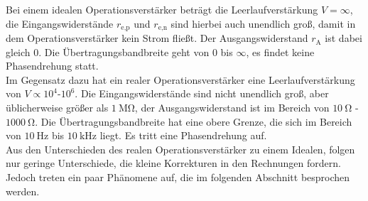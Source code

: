        Bei einem idealen Operationsverstärker beträgt die Leerlaufverstärkung $V = \infty$, die Eingangswiderstände $r_\text{e,p}$ und $r_\text{e,n}$ sind hierbei auch unendlich 
        groß, damit in dem Operationsverstärker kein Strom fließt. 
        Der Ausgangswiderstand $r_\text{A}$ ist dabei gleich $0$. Die Übertragungsbandbreite geht von $0$ bis $\infty$, es findet keine Phasendrehung statt. \\ 
        Im Gegensatz dazu hat ein realer Operationsverstärker eine Leerlaufverstärkung von $V \propto 10^4$-$10^6$. 
        Die Eingangswiderstände sind nicht unendlich groß, aber üblicherweise größer als $\SI{1}{\mega\ohm}$, der Ausgangswiderstand ist im Bereich von $\SI{10}{\ohm}$ - $\SI{1000}{\ohm}$. 
        Die Übertragungsbandbreite hat eine obere Grenze, die sich im Bereich von $\SI{10}{\hertz}$ bis $\SI{10}{\kilo\hertz}$ liegt.
        Es tritt eine Phasendrehung auf. \\
        Aus den Unterschieden des realen Operationsverstärker zu einem Idealen, folgen nur geringe Unterschiede, die kleine Korrekturen in den Rechnungen fordern. 
        Jedoch treten ein paar Phänomene auf, die im folgenden Abschnitt besprochen werden. \\

